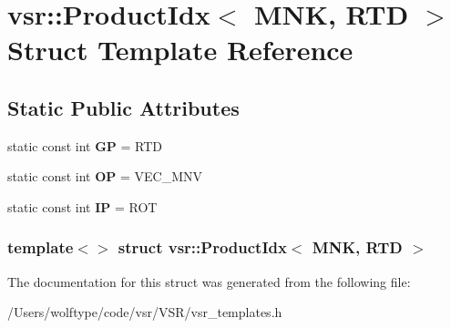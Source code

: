 \hypertarget{structvsr_1_1_product_idx_3_01_m_n_k_00_01_r_t_d_01_4}{\section{vsr\-:\-:Product\-Idx$<$ M\-N\-K, R\-T\-D $>$ Struct Template Reference}
\label{structvsr_1_1_product_idx_3_01_m_n_k_00_01_r_t_d_01_4}
}
\subsection*{Static Public Attributes}
\begin{DoxyCompactItemize}
\item 
\hypertarget{structvsr_1_1_product_idx_3_01_m_n_k_00_01_r_t_d_01_4_a1a2b958dfdf555bbd9564f8dee608a03}{static const int {\bfseries G\-P} = R\-T\-D}\label{structvsr_1_1_product_idx_3_01_m_n_k_00_01_r_t_d_01_4_a1a2b958dfdf555bbd9564f8dee608a03}

\item 
\hypertarget{structvsr_1_1_product_idx_3_01_m_n_k_00_01_r_t_d_01_4_a9510bee1f2e7db43481295a9ea40d840}{static const int {\bfseries O\-P} = V\-E\-C\-\_\-\-M\-N\-V}\label{structvsr_1_1_product_idx_3_01_m_n_k_00_01_r_t_d_01_4_a9510bee1f2e7db43481295a9ea40d840}

\item 
\hypertarget{structvsr_1_1_product_idx_3_01_m_n_k_00_01_r_t_d_01_4_ad75102eb3bedffd7d16ff1001eef3724}{static const int {\bfseries I\-P} = R\-O\-T}\label{structvsr_1_1_product_idx_3_01_m_n_k_00_01_r_t_d_01_4_ad75102eb3bedffd7d16ff1001eef3724}

\end{DoxyCompactItemize}
\subsubsection*{template$<$$>$ struct vsr\-::\-Product\-Idx$<$ M\-N\-K, R\-T\-D $>$}



The documentation for this struct was generated from the following file\-:\begin{DoxyCompactItemize}
\item 
/\-Users/wolftype/code/vsr/\-V\-S\-R/vsr\-\_\-templates.\-h\end{DoxyCompactItemize}
